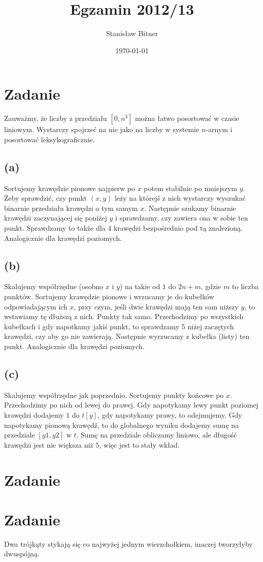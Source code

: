 \documentclass[12pt, a4paper]{article}
\title{Egzamin 2012/13}
\author{Stanisław Bitner}
\date{\today}
\newcounter{zadanie}
\newcommand{\zadanie}{\addtocounter{zadanie}{1}\section*{Zadanie \arabic{zadanie}}}
\begin{document}
\maketitle
\zadanie{}
Zauważmy, że liczby z przedziału $[0,n^3]$ można łatwo posortować w czasie
liniowym. Wystarczy spojrzeć na nie jako na liczby w systemie $n$-arnym
i posortować leksykograficznie.

\subsection*{(a)}
Sortujemy krawędzie pionowe najpierw po $x$ potem stabilnie po mniejszym $y$.
Żeby sprawdzić, czy punkt $(x,y)$ leży na którejś z nich wystarczy wyszukać
binarnie przedziału krawędzi o tym samym $x$. Następnie szukamy binarnie
krawędzi zaczynającej się poniżej $y$ i sprawdzamy, czy zawiera ona w sobie ten
punkt. Sprawdzamy to także dla $4$ krawędzi bezpośrednio pod tą znalezioną.
Analogicznie dla krawędzi poziomych.

\subsection*{(b)}
Skalujemy współrzędne (osobno $x$ i $y$) na takie od $1$ do $2n+m$, gdzie $m$
to liczba punktów. Sortujemy krawędzie pionowe i wrzucamy je do kubełków
odpowiadającym ich $x$, przy czym, jeśli dwie krawędzi mają ten sam niższy $y$,
to wstawiamy tę dłuższą z nich. Punkty tak samo. Przechodzimy po wszystkich
kubełkach i gdy napotkamy jakiś punkt, to sprawdzamy 5 niżej zaczętych
krawędzi, czy aby go nie zawierają. Następnie wyrzucamy z kubełka (listy) ten
punkt. Analogicznie dla krawędzi poziomych.

\subsection*{(c)}
Skalujemy współrzędne jak poprzednio. Sortujemy punkty końcowe po $x$.
Przechodzimy po nich od lewej do prawej. Gdy napotykamy lewy punkt poziomej
krawędzi dodajemy $1$ do $t[y]$, gdy napotykamy prawy, to odejmujemy. Gdy
napotykamy pionową krawędź, to do globalnego wyniku dodajemy sumę na przedziale
$[y1,y2]$ w $t$. Sumę na przedziale obliczamy liniowo, ale długość krawędzi
jest nie większa niż $5$, więc jest to stały wkład.

\zadanie{}

\zadanie{}
Dwa trójkąty stykają się co najwyżej jednym wierzchołkiem, inaczej tworzyłyby
dwuspójną.
\end{document}
